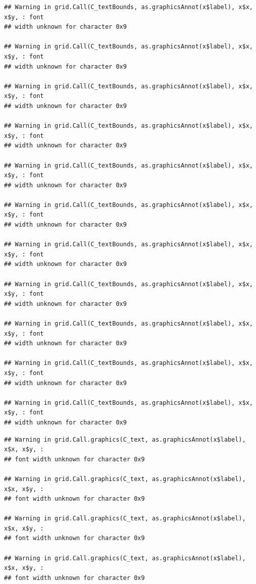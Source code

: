 \documentclass[
]{article}
\begin{document}
\begin{verbatim}
## Warning in grid.Call(C_textBounds, as.graphicsAnnot(x$label), x$x, x$y, : font
## width unknown for character 0x9

## Warning in grid.Call(C_textBounds, as.graphicsAnnot(x$label), x$x, x$y, : font
## width unknown for character 0x9

## Warning in grid.Call(C_textBounds, as.graphicsAnnot(x$label), x$x, x$y, : font
## width unknown for character 0x9

## Warning in grid.Call(C_textBounds, as.graphicsAnnot(x$label), x$x, x$y, : font
## width unknown for character 0x9

## Warning in grid.Call(C_textBounds, as.graphicsAnnot(x$label), x$x, x$y, : font
## width unknown for character 0x9

## Warning in grid.Call(C_textBounds, as.graphicsAnnot(x$label), x$x, x$y, : font
## width unknown for character 0x9

## Warning in grid.Call(C_textBounds, as.graphicsAnnot(x$label), x$x, x$y, : font
## width unknown for character 0x9

## Warning in grid.Call(C_textBounds, as.graphicsAnnot(x$label), x$x, x$y, : font
## width unknown for character 0x9

## Warning in grid.Call(C_textBounds, as.graphicsAnnot(x$label), x$x, x$y, : font
## width unknown for character 0x9

## Warning in grid.Call(C_textBounds, as.graphicsAnnot(x$label), x$x, x$y, : font
## width unknown for character 0x9

## Warning in grid.Call(C_textBounds, as.graphicsAnnot(x$label), x$x, x$y, : font
## width unknown for character 0x9
\end{verbatim}

\begin{verbatim}
## Warning in grid.Call.graphics(C_text, as.graphicsAnnot(x$label), x$x, x$y, :
## font width unknown for character 0x9

## Warning in grid.Call.graphics(C_text, as.graphicsAnnot(x$label), x$x, x$y, :
## font width unknown for character 0x9

## Warning in grid.Call.graphics(C_text, as.graphicsAnnot(x$label), x$x, x$y, :
## font width unknown for character 0x9

## Warning in grid.Call.graphics(C_text, as.graphicsAnnot(x$label), x$x, x$y, :
## font width unknown for character 0x9
\end{verbatim}
\end{document}
